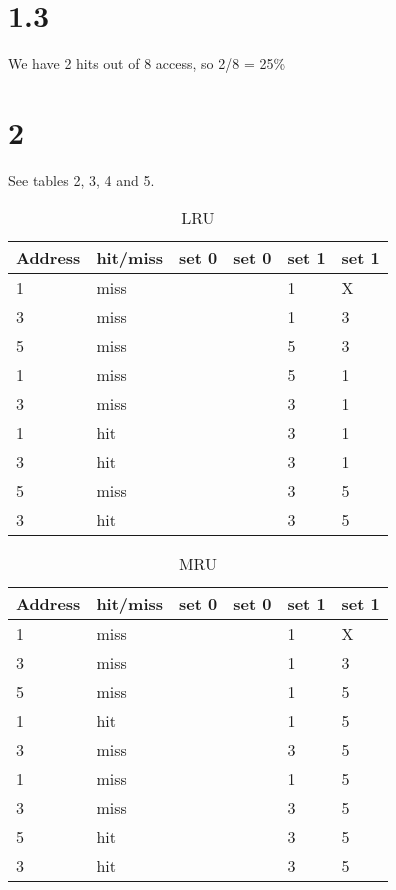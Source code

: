 \documentclass[10pt,a4paper]{article}
\begin{document}
\section*{1.3}
We have 2 hits out of 8 access, so 2/8 = 25\%
\section*{2}
See tables 2, 3, 4 and 5.
\begin{table}[h]
	\centering
	\caption{LRU}
	\label{my-label}
	\begin{tabular}{|l|l|l|l|l|l|}
		\hline
	Address	& hit/miss  & set 0  & set 0  & set 1  & set 1  \\ \hline
		1& miss  &  &  & 1 & X \\ \hline
		3& miss &  &  & 1 &3  \\ \hline
		5&miss  &  &  & 5 & 3 \\ \hline
		1& miss &  &  & 5 & 1 \\ \hline
		3& miss &  &  & 3 &  1\\ \hline
		1&  hit&  &  & 3 &  1\\ \hline
		3&  hit&  &  & 3 &  1\\ \hline
		5& miss &  &  & 3 & 5 \\ \hline
		3& hit&  &  & 3  & 5 \\ \hline
	\end{tabular}
\end{table}
\begin{table}[h]
	\centering
	\caption{MRU}
	\label{my-label}
	\begin{tabular}{|l|l|l|l|l|l|}
		\hline
		Address	& hit/miss  & set 0  & set 0  & set 1  & set 1  \\ \hline
		1& miss &  &  & 1 & X  \\ \hline
		3& miss &  &  & 1 & 3  \\ \hline
		5& miss &  &  & 1 & 5  \\ \hline
		1& hit &  &  &  1& 5  \\ \hline
		3& miss &  &  &  3&5  \\ \hline
		1&  miss&  &  &  1&5  \\ \hline
		3&  miss&  &  &  3& 5 \\ \hline
		5& hit &  &  &  3&  5 \\ \hline
		3& hit &  &  &  3& 5 \\ \hline
	\end{tabular}
\end{table}
\end{document}
